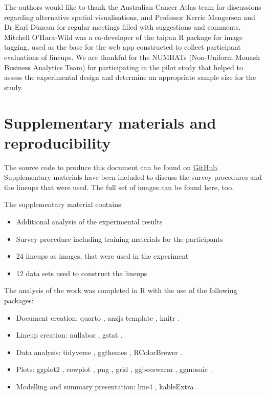 \documentclass[
doublespace,
  times]{anzsauth}
\providecommand{\tightlist}{%
  \setlength{\itemsep}{0pt}\setlength{\parskip}{0pt}}
\begin{document}
The authors would like to thank the Australian Cancer Atlas team for
discussions regarding alternative spatial visualisations, and Professor
Kerrie Mengersen and Dr Earl Duncan for regular meetings filled with
suggestions and comments. Mitchell O'Hara-Wild was a co-developer of the
taipan \citep{taipan} R package for image tagging, used as the base for
the web app constructed to collect participant evaluations of lineups.
We are thankful for the NUMBATs (Non-Uniform Monash Business Analytics
Team) for participating in the pilot study that helped to assess the
experimental design and determine an appropriate sample size for the
study.

\section*{Supplementary materials and
reproducibility}\label{supplementary-materials-and-reproducibility}

The source code to produce this document can be found on
\href{https://github.com/srkobakian/experiment/paper}{GitHub}.
Supplementary materials have been included to discuss the survey
procedures and the lineups that were used. The full set of images can be
found here, too.

The supplementary material contains:

\begin{itemize}
\tightlist
\item
  Additional analysis of the experimental results
\item
  Survey procedure including training materials for the participants
\item
  24 lineups as images, that were used in the experiment
\item
  12 data sets used to construct the lineups
\end{itemize}

The analysis of the work was completed in R \citep{RCore} with the use
of the following packages:

\begin{itemize}
\tightlist
\item
  Document creation: quarto \citep{Allaire_Quarto_2025}, anzjs template
  \citep{quarto-anzjs}, knitr \citep{knitr}.
\item
  Lineup creation: nullabor \citep{nullabor}, gstat \citep{gstat}.
\item
  Data analysis: tidyverse \citep{tidyverse}, ggthemes \citep{ggthemes},
  RColorBrewer \citep{RColorBrewer}.
\item
  Plots: ggplot2 \citep{ggplot2}, cowplot \citep{cowplot}, png
  \citep{png}, grid \citep{grid}, ggbeeswarm \citep{ggbeeswarm},
  ggmosaic \citep{ggmosaic}.
\item
  Modelling and summary presentation: lme4 \citep{lme4}, kableExtra
  \citep{kableExtra}.
\end{itemize}
\end{document}
